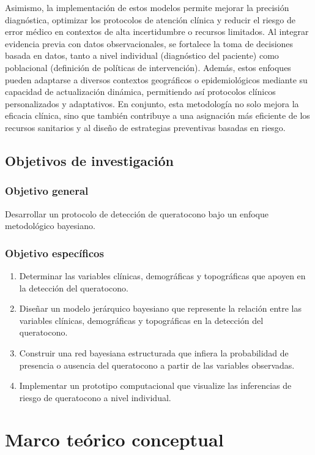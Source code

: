 Asimismo, la implementación de estos modelos permite mejorar la precisión diagnóstica, optimizar los protocolos de atención clínica y reducir el riesgo de error médico en contextos de alta incertidumbre o recursos limitados. Al integrar evidencia previa con datos observacionales, se fortalece la toma de decisiones basada en datos, tanto a nivel individual (diagnóstico del paciente) como poblacional (definición de políticas de intervención). Además, estos enfoques pueden adaptarse a diversos contextos geográficos o epidemiológicos mediante su capacidad de actualización dinámica, permitiendo así protocolos clínicos personalizados y adaptativos. En conjunto, esta metodología no solo mejora la eficacia clínica, sino que también contribuye a una asignación más eficiente de los recursos sanitarios y al diseño de estrategias preventivas basadas en riesgo.



\subsection{Objetivos de investigación}
\subsubsection{Objetivo general}
Desarrollar un protocolo de detección de queratocono bajo un enfoque metodológico bayesiano.

\subsubsection{Objetivo específicos}
\begin{enumerate}
\item Determinar las variables clínicas, demográficas y topográficas que apoyen en la detección del queratocono.
\item Diseñar un modelo jerárquico bayesiano que represente la relación entre las variables clínicas, demográficas y topográficas en la detección del queratocono.
\item Construir una red bayesiana estructurada que infiera la probabilidad de presencia o ausencia del queratocono a partir de las variables observadas.
\item Implementar un prototipo computacional que visualize las inferencias de riesgo de queratocono a nivel individual.
\end{enumerate}

\newpage
\section{Marco teórico conceptual}
